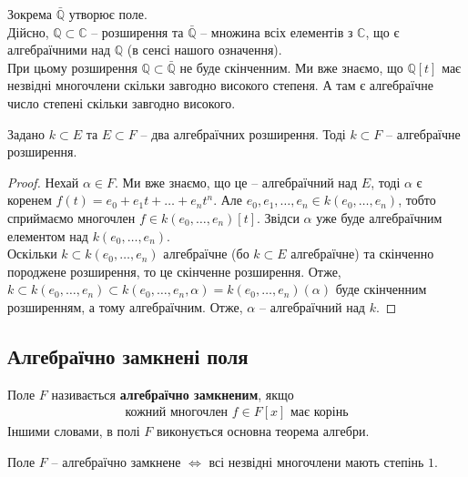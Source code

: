 \documentclass{math_library}
\begin{document}
\begin{example}
Зокрема $\bar{\mathbb{Q}}$ утворює поле.\\
Дійсно, $\mathbb{Q} \subset \mathbb{C}$ -- розширення та $\bar{\mathbb{Q}}$ -- множина всіх елементів з $\mathbb{C}$, що є алгебраїчними над $\mathbb{Q}$ (в сенсі нашого означення).\\
При цьому розширення $\mathbb{Q} \subset \bar{\mathbb{Q}}$ не буде скінченним. Ми вже знаємо, що $\mathbb{Q}[t]$ має незвідні многочлени скільки завгодно високого степеня. А там є алгебраїчне число степені скільки завгодно високого.
\end{example}

\begin{proposition}
Задано $k \subset E$ та $E \subset F$ -- два алгебраїчних розширення. Тоді $k \subset F$ -- алгебраїчне розширення.
\end{proposition}

\begin{proof}
Нехай $\alpha \in F$. Ми вже знаємо, що це -- алгебраїчний над $E$, тоді $\alpha$ є коренем $f(t) = e_0 + e_1 t + \dots + e_n t^n$. Але $e_0,e_1,\dots,e_n \in k(e_0,\dots,e_n)$, тобто сприймаємо многочлен $f \in k(e_0,\dots,e_n)[t]$. Звідси $\alpha$ уже буде алгебраїчним елементом над $k(e_0,\dots,e_n)$.\\
Оскільки $k \subset k(e_0,\dots,e_n)$ алгебраїчне (бо $k \subset E$ алгебраїчне) та скінченно породжене розширення, то це скінченне розширення. Отже, $k \subset k(e_0,\dots,e_n) \subset k(e_0,\dots,e_n,\alpha) = k(e_0,\dots,e_n)(\alpha)$ буде скінченним розширенням, а тому алгебраїчним. Отже, $\alpha$ -- алгебраїчний над $k$.
\end{proof}

\subsection{Алгебраїчно замкнені поля}
\begin{definition}
Поле $F$ називається \textbf{алгебраїчно замкненим}, якщо
\begin{align*}
\text{кожний многочлен } f \in F[x] \text{ має корінь}
\end{align*}
Іншими словами, в полі $F$ виконується основна теорема алгебри.
\end{definition}

\begin{proposition}
Поле $F$ -- алгебраїчно замкнене $\iff$ всі незвідні многочлени мають степінь $1$. 
\end{proposition}
\end{document}
